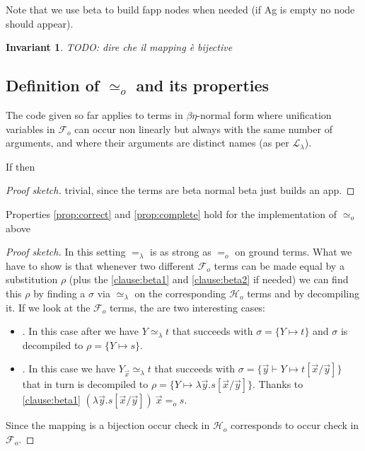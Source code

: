 \documentclass[sigconf,natbib=false,review]{acmart}
\newtheorem{invariant}{Invariant}
\newcommand{\EqualRel}{\ensuremath{=}}
\newcommand{\UnifRel}{\ensuremath{\simeq}}
\newcommand{\Uo}{\ensuremath{\UnifRel_o}\xspace}
\newcommand{\Eo}{\ensuremath{\EqualRel_o}\xspace}
\newcommand{\Ue}{\ensuremath{\UnifRel_\lambda}\xspace}
\newcommand{\Ee}{\ensuremath{\EqualRel_\lambda}\xspace}
\newcommand{\llambda}{\ensuremath{\mathcal{L}_\lambda}\xspace}
\newcommand{\Fo}{\ensuremath{\mathcal{F}_{\!o}\xspace}} %
\newcommand{\Ho}{\ensuremath{\mathcal{H}_o}\xspace}
\begin{document}
\noindent
Note that we use beta to build fapp nodes when needed (if Ag is empty
no  node should appear).


\begin{invariant}

  TODO: dire che il mapping è bijective
  \label{inv:map-bijective}
\end{invariant}

\subsection{Definition of \Uo and its properties}\label{sec:founif}



The code given so far applies to terms in $\beta\eta$-normal form where
unification variables in \Fo{} can occur non linearly but always with
the same number of arguments, and where their arguments are distinct names
(as per \llambda).

\begin{lemma} If
   then 
\end{lemma}
\begin{proof}[Proof sketch]
trivial, since the terms are beta normal beta just builds an app. 
\end{proof}


\begin{lemma}
Properties \ref{prop:correct} and
\ref{prop:complete} hold for the implementation of \Uo above
\end{lemma}
\begin{proof}[Proof sketch]
 In this setting \Ee is as strong as
\Eo on ground terms. What we have to show is that whenever two different \Fo
terms can be made equal by a substitution $\rho$ (plus the \ref{clause:beta1}
and \ref{clause:beta2} if needed) we can find this $\rho$ by finding
a $\sigma$ via \Ue{} on the corresponding \Ho terms and by decompiling it.
If we look at the \Fo{} terms, the are two interesting cases:
\begin{itemize}
\item \elpiIn{fuva X ~\Uo~s}. In this case after  we have
  $Y \Ue t$ that succeeds with $\sigma = \{ Y \mapsto t\}$ and
  $\sigma$ is decompiled to $\rho = \{ Y \mapsto s\}$.
\item \elpiIn{fapp[fuva X|L] ~\Uo~s}. In this case
 we have $Y_{\vec{x}} \Ue t$ that succeeds with
 $\sigma = \{ \vec{y} \vdash Y \mapsto t[\vec{x}/\vec{y}]\}$ that in turn
 is decompiled to $\rho = \{ Y \mapsto \lambda \vec{y}.s[\vec{x}/\vec{y}]\}$.
 Thanks to \ref{clause:beta1}
 $(\lambda \vec{y}.s[\vec{x}/\vec{y}])~\vec{x} \Eo s$.
\end{itemize}
Since the mapping is a bijection occur check in \Ho{} corresponds to occur
check in \Fo{}.
\end{proof}
\end{document}
